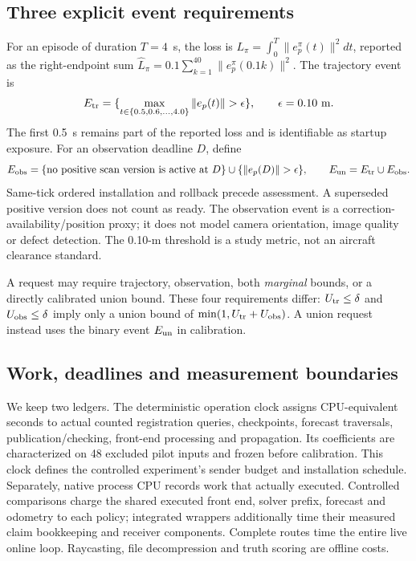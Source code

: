 \subsection{Three explicit event requirements}
For an episode of duration $T=4$~s, the loss is $L_\pi=\int_0^T\|e_p^\pi(t)\|^2dt$, reported as the right-endpoint sum $\widehat L_\pi=0.1\sum_{k=1}^{40}\|e_p^\pi(0.1k)\|^2$. The trajectory event is
\begin{equation}
E_{\rm tr}=\{\max_{t\in\{0.5,0.6,\ldots,4.0\}}\|e_p(t)\|>\epsilon\},\qquad\epsilon=0.10\ {\rm m}.\label{eq:episode-event}
\end{equation}
The first 0.5~s remains part of the reported loss and is identifiable as startup exposure. For an observation deadline $D$, define
\begin{equation}
E_{\rm obs}=\{\text{no positive scan version is active at }D\}\cup\{\|e_p(D)\|>\epsilon\},\qquad
E_{\rm un}=E_{\rm tr}\cup E_{\rm obs}.\label{eq:observation-event}
\end{equation}
Same-tick ordered installation and rollback precede assessment. A superseded positive version does not count as ready. The observation event is a correction-availability/position proxy; it does not model camera orientation, image quality or defect detection. The 0.10-m threshold is a study metric, not an aircraft clearance standard.

A request may require trajectory, observation, both \emph{marginal} bounds, or a directly calibrated union bound. These four requirements differ: $U_{\rm tr}\le\delta$ and $U_{\rm obs}\le\delta$ imply only a union bound of $\min(1,U_{\rm tr}+U_{\rm obs})$. A union request instead uses the binary event $E_{\rm un}$ in calibration.

\subsection{Work, deadlines and measurement boundaries}
We keep two ledgers. The deterministic operation clock assigns CPU-equivalent seconds to actual counted registration queries, checkpoints, forecast traversals, publication/checking, front-end processing and propagation. Its coefficients are characterized on 48 excluded pilot inputs and frozen before calibration. This clock defines the controlled experiment's sender budget and installation schedule. Separately, native process CPU records work that actually executed. Controlled comparisons charge the shared executed front end, solver prefix, forecast and odometry to each policy; integrated wrappers additionally time their measured claim bookkeeping and receiver components. Complete routes time the entire live online loop. Raycasting, file decompression and truth scoring are offline costs.

